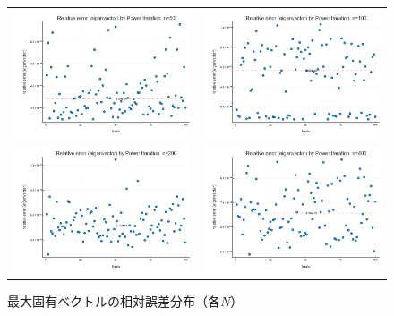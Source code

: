 \documentclass[a4paper,11pt]{ltjsarticle}
\begin{document}
\begin{figure}[H]
  \centering
  \begin{tabular}{cc}
    \includegraphics[width=72mm]{graphs/exp3_n50_relerr_eigenvector.png} &
    \includegraphics[width=72mm]{graphs/exp3_n100_relerr_eigenvector.png} \\
    \includegraphics[width=72mm]{graphs/exp3_n200_relerr_eigenvector.png} &
    \includegraphics[width=72mm]{graphs/exp3_n400_relerr_eigenvector.png} \\
  \end{tabular}
  \caption{最大固有ベクトルの相対誤差分布（各$N$）}
  \label{fig:exp3_relerr_v}
\end{figure}
\end{document}
